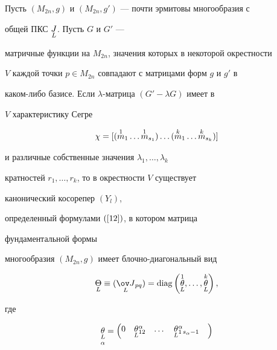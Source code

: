 \begin{thm}


Пусть $(M_{2n},g)$ и $(M_{2n},g')$ --- почти эрмитовы многообразия с


общей ПКС $\underset{L}{J}$. Пусть $G$ и $G'$ ---


матричные функции на $M_{2n}$, значения которых в некоторой окрестности


$V$ каждой точки $p\in M_{2n}$ совпадают с матрицами форм $g$ и $g'$ в


каком-либо базисе. Если $\lambda$-матрица $(G'- \lambda G)$ имеет в


$V$ характеристику Сегре


\begin{equation} \label{26}


\chi =[(\up{1}{m}_1\dotsc \up{1}{m}_{s_1})\dotsc


(\up{k}{m}_1\dotsc \up{k}{m}_{s_k})]


\end{equation}


и различные собственные значения $\lambda_1,\dotsc ,\lambda_k$


кратностей $r_1,\dotsc ,r_k$, то в окрестности $V$ существует


канонический косорепер $(Y_l)$,


определенный формулами $(\ref{12})$, в котором матрица


фундаментальной формы


многообразия $(M_{2n},g)$ имеет блочно-диагональный вид


\begin{equation} \label{27}


\down{L}{\Theta}\equiv ({\down{L}{\ov J}}{}_{pq})=\diag\left(


\overset{1}{\down{L}{\theta}}{},\dotsc,


\overset{k}{\down{L}{\theta}}{}\right),


\end{equation}


где 


\begin{equation} \label{28}


\underset{\alpha}{\down{L}{\theta}}{}=


\begin{pmatrix}


0 & \down{L}{\theta}{}^{\alpha}_{12} & \dotsc &


{\down{L}{\theta}}{}^{\alpha}_{1\, s_{\alpha}-1} &



\end{pmatrix}
\end{equation}
\end{thm}
